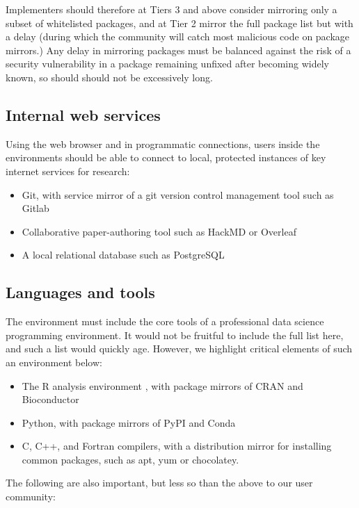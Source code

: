 \documentclass[10pt,a4paper,twocolumn]{article}
\begin{document}
Implementers should therefore at Tiers 3 and above consider mirroring only a subset of whitelisted packages, and at Tier 2 mirror the full package list but with a delay
(during which the community will catch most malicious code on package mirrors.) Any delay in mirroring packages must be balanced against the risk of a security vulnerability in a package remaining unfixed after becoming widely known, so should should not be excessively long.

\subsection{Internal web services}

Using the web browser and in programmatic connections, users inside the environments should be able to connect to
local, protected instances of key internet services for research:

\begin{itemize}
    \item Git, with service mirror of a git version control management tool such as Gitlab
    \item Collaborative paper-authoring tool such as HackMD or Overleaf
    \item A local relational database such as PostgreSQL
\end{itemize}

\subsection{Languages and tools}

The environment must include the core tools of a professional data science programming environment.
It would not be fruitful to include the full list here, and such a list would quickly age.
However, we highlight critical elements of such an environment below:

\begin{itemize}
    \item The R analysis environment \cite{RCoreTeam}, with package mirrors of CRAN and Bioconductor
    \item Python, with package mirrors of PyPI and Conda
     \item C, C++, and Fortran compilers, with a distribution mirror for installing common packages, such as apt, yum or chocolatey.
\end{itemize}

The following are also important, but less so than the above to our user community:
\end{document}
